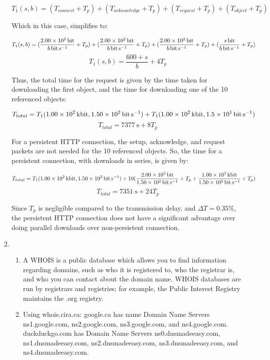 \documentclass{article}
\begin{document}
\begin{enumerate}
$$ T_1(s,b) = (T_{connect} + T_p) + (T_{acknowledge} + T_p) + (T_{request} + T_p) + (T_{object} + T_p) $$

Which in this case, simplifies to:

$$ T_1(s,b) = (\frac{\SI{200}{\bit}}{\SI[parse-numbers = false]{b}{\bit\per\second}} + T_p) + (\frac{\SI{200}{\bit}}{\SI[parse-numbers = false]{b}{\bit\per\second}} + T_p) + (\frac{\SI{200}{\bit}}{\SI[parse-numbers = false]{b}{\bit\per\second}} + T_p) + (\frac{\SI[parse-numbers = false]{s}{\bit}}{\SI[parse-numbers = false]{b}{\bit\per\second}} + T_p) $$
$$ T_1(s,b) = \frac{600 + s}{b} + 4T_p $$

Thus, the total time for the request is given by the time taken for downloading the first object, and the time for downloading one of the 10 referenced objects:

$$ T_{total} = T_1(\SI{100}{\kilo\bit}, \SI{150}{\bit\per\second}) + T_1(\SI{100}{\kilo\bit}, \SI{15}{\bit\per\second}) $$
$$ T_{total} = \SI{7377}{\second} + 8T_p $$

For a persistent HTTP connection, the setup, acknowledge, and request packets are not needed for the 10 referenced objects. So, the time for a persistent connection, with downloads in series, is given by:

$$ T_{total} = T_1(\SI{100}{\kilo\bit}, \SI{150}{\bit\per\second}) + 10(\frac{\SI{200}{\bit}}{\SI{150}{\bit\per\second}} + T_p + \frac{\SI{100}{\kilo\bit}}{\SI{150}{\bit\per\second}} + T_p) $$
$$ T_{total} = \SI{7351}{\second} + 24T_p $$

Since $ T_p $ is negligible compared to the transmission delay, and $ \Delta T = 0.35\% $, the persistent HTTP connection does not have a significant advantage over doing parallel downloads over non-persistent connection.

\item
\begin{enumerate}

\item A WHOIS is a public database which allows you to find information regarding domains, such as who it is registered to, who the registrar is, and who you can contact about the domain name. WHOIS databases are run by registrars and registries; for example, the Public Interest Registry maintains the .org registry.

\item Using whois.cira.ca: google.ca has name Domain Name Servers ns1.google.com, ns2.google.com, ns3.google.com, and ns4.google.com. duckduckgo.com has Domain Name Servers ns0.dnsmadeeasy.com, ns1.dnsmadeeasy.com, ns2.dnsmadeeasy.com, ns3.dnsmadeeasy.com, and ns4.dnsmadeeasy.com.


\end{enumerate}
\end{enumerate}
\end{document}
